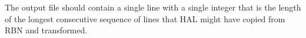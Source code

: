 The output file should contain a single line with a single integer that is the length of the longest consecutive sequence of lines that HAL might have copied from RBN and transformed.